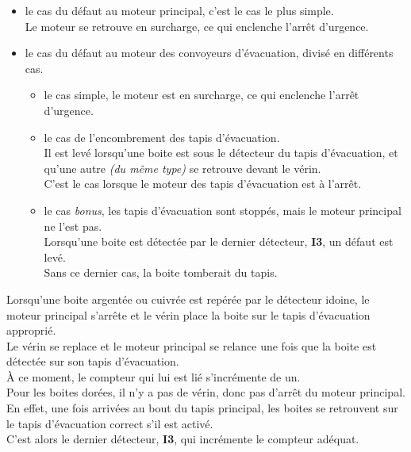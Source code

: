 \begin{itemize}
    
    \item le cas du défaut au moteur principal, c'est le cas le plus simple.\\
    Le moteur se retrouve en surcharge, ce qui enclenche l'arrêt d'urgence.
    
    \item le cas du défaut au moteur des convoyeurs d'évacuation, divisé en différents cas.
    
    \begin{itemize}
    
        \item le cas simple, le moteur est en surcharge, ce qui enclenche l'arrêt d'urgence.
        
        \item le cas de l'encombrement des tapis d’évacuation.\\
        Il est levé lorsqu'une boite est sous le détecteur du tapis d'évacuation, et qu'une autre \textit{(du même type)} se retrouve devant le vérin.\\
        C'est le cas lorsque le moteur des tapis d’évacuation est à l'arrêt.
        
        \item le cas \textit{bonus}, les tapis d'évacuation sont stoppés, mais le moteur principal ne l'est pas.\\
        Lorsqu'une boite est détectée par le dernier détecteur, \textbf{I3}, un défaut est levé.\\
        Sans ce dernier cas, la boite tomberait du tapis.
        
    \end{itemize}
    
\end{itemize}

\newpage

Lorsqu'une boite argentée ou cuivrée est repérée par le détecteur idoine, le moteur principal s'arrête et le vérin place la boite sur le tapis d'évacuation approprié.\\
Le vérin se replace et le moteur principal se relance une fois que la boite est détectée sur son tapis d'évacuation.\\
À ce moment, le compteur qui lui est lié s'incrémente de un.\\

Pour les boites dorées, il n'y a pas de vérin, donc pas d'arrêt du moteur principal.\\
En effet, une fois arrivées au bout du tapis principal, les boites se retrouvent sur le tapis d'évacuation correct s'il est activé.\\
C'est alors le dernier détecteur, \textbf{I3}, qui incrémente le compteur adéquat.\\

